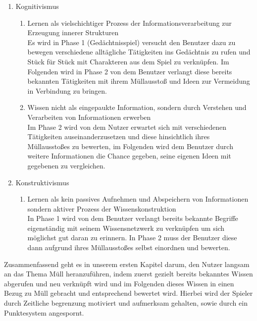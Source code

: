 \documentclass[a4paper]{article}
\begin{document}
\begin{enumerate}
\begin{enumerate}
\item Kognitivismus
  \begin{enumerate}
    \item Lernen als vielschichtiger Prozess der Informationsverarbeitung zur Erzeugung innerer Strukturen\\
    Es wird in Phase 1 (Gedächtnisspiel) versucht den Benutzer dazu zu bewegen verschiedene alltägliche Tätigkeiten ins Gedächtnis zu rufen und Stück für Stück mit Charakteren aus dem Spiel zu verknüpfen. Im Folgenden wird in Phase 2 von dem Benutzer verlangt diese bereits bekannten Tätigkeiten mit ihrem Müllausstoß und Ideen zur Vermeidung in Verbindung zu bringen.
    \item Wissen nicht als eingepaukte Information, sondern durch Verstehen und Verarbeiten von Informationen erwerben\\
    Im Phase 2 wird von dem Nutzer erwartet sich mit verschiedenen Tätigkeiten auseinanderzusetzen und diese hinsichtlich ihres Müllausstoßes zu bewerten, im Folgenden wird dem Benutzer durch weitere Informationen die Chance gegeben, seine eigenen Ideen mit gegebenen zu vergleichen.
  \end{enumerate}

\item Konstruktivismus
  \begin{enumerate}
    \item Lernen als kein passives Aufnehmen und Abspeichern von Informationen sondern aktiver Prozess der Wissenskonstruktion\\
    In Phase 1 wird von dem Benutzer verlangt bereits bekannte Begriffe eigenständig mit seinem Wissensnetzwerk zu verknüpfen um sich möglichst gut daran zu erinnern. In Phase 2 muss der Benutzer diese dann aufgrund ihres Müllausstoßes selbst einordnen und bewerten.
  \end{enumerate}

\end{enumerate}

Zusammenfassend geht es in unserem ersten Kapitel darum, den Nutzer langsam an das Thema Müll heranzuführen, indem zuerst gezielt bereits bekanntes Wissen abgerufen und neu verknüpft wird und im Folgenden dieses Wissen in einen Bezug zu Müll gebracht und entsprechend bewertet wird. Hierbei wird der Spieler durch Zeitliche begrenzung motiviert und aufmerksam gehalten, sowie durch ein Punktesystem angespornt.



\end{enumerate}
\end{document}
